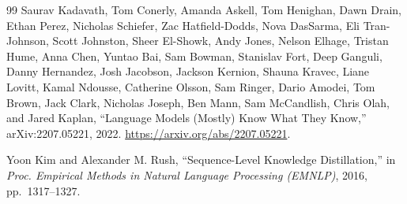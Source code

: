 \begin{thebibliography}{99}
 Saurav Kadavath, Tom Conerly, Amanda Askell, Tom Henighan, Dawn Drain, Ethan Perez, Nicholas Schiefer, Zac Hatfield-Dodds, Nova DasSarma, Eli Tran-Johnson, Scott Johnston, Sheer El-Showk, Andy Jones, Nelson Elhage, Tristan Hume, Anna Chen, Yuntao Bai, Sam Bowman, Stanislav Fort, Deep Ganguli, Danny Hernandez, Josh Jacobson, Jackson Kernion, Shauna Kravec, Liane Lovitt, Kamal Ndousse, Catherine Olsson, Sam Ringer, Dario Amodei, Tom Brown, Jack Clark, Nicholas Joseph, Ben Mann, Sam McCandlish, Chris Olah, and Jared Kaplan, ``Language Models (Mostly) Know What They Know,'' arXiv:2207.05221, 2022. \url{https://arxiv.org/abs/2207.05221}.

 Yoon Kim and Alexander M. Rush, ``Sequence-Level Knowledge Distillation,'' in \emph{Proc. Empirical Methods in Natural Language Processing (EMNLP)}, 2016, pp.~1317--1327.

\end{thebibliography}
